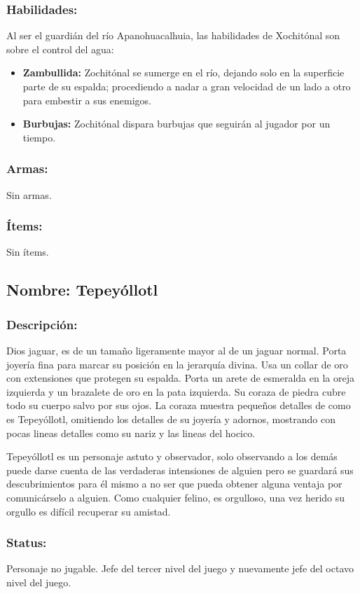 \documentclass[11pt,letterpaper]{article}
\begin{document}
\subsubsection{Habilidades:}
Al ser el guardián del río  Apanohuacalhuia, las habilidades de Xochitónal son sobre el control del agua:
\begin{itemize}
	\item \textbf{Zambullida:} Zochitónal se sumerge en el río, dejando solo en la superficie parte de su espalda; procediendo a nadar a gran velocidad de un lado a otro para embestir a sus enemigos.  
	\item \textbf{Burbujas:} Zochitónal dispara burbujas que seguirán al jugador por un tiempo. 
\end{itemize}
\subsubsection{Armas:}
Sin armas.
\subsubsection{Ítems:}
Sin ítems.

\subsection{Nombre: Tepeyóllotl}  
\subsubsection{Descripción:}    
Dios jaguar, es de un tamaño ligeramente mayor al de un jaguar normal. Porta joyería fina para marcar su posición en la jerarquía divina. Usa un collar de oro con extensiones que protegen su espalda. Porta un arete de esmeralda en la oreja izquierda y un brazalete de oro en la pata izquierda. Su coraza de piedra cubre todo su cuerpo salvo por sus ojos. La coraza muestra pequeños detalles de como es Tepeyóllotl, omitiendo los detalles de su joyería y adornos, mostrando con pocas lineas detalles como su nariz y las lineas del hocico.
\\
\par
Tepeyóllotl es un personaje astuto y observador, solo observando a los demás puede darse cuenta de las verdaderas intensiones de alguien pero se guardará sus descubrimientos para él mismo a no ser que pueda obtener alguna ventaja por comunicárselo a alguien. Como cualquier felino, es orgulloso, una vez herido su orgullo es difícil recuperar su amistad. \subsubsection{Status:}
Personaje no jugable.
Jefe del tercer nivel del juego y nuevamente jefe del octavo nivel del juego.
\end{document}
